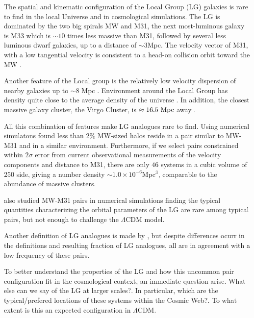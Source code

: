 \documentclass{emulateapj}
\newcommand{\lcdm}{$\Lambda$CDM }
\newcommand{\mpc}{\rm{Mpc}}
\newcommand{\hmpc}{{\ifmmode{h^{-1}{\rm Mpc}}\else{$h^{-1}$Mpc }\fi}}
\begin{document}
The spatial and kinematic configuration of the Local Group
(LG) galaxies is rare to find in the local Universe and in cosmological
simulations. 
The LG is dominated by the two big spirals MW and M31, the next
most-luminous galaxy is M33 which is $\sim 10$ times less massive than
M31, followed by several less luminous dwarf galaxies, up to a
distance of $\sim 3$\mpc.   
The velocity vector of M31, with a low
tangential velocity is consistent to a head-on collision orbit toward
the MW
\citep{2008MNRAS.386..461C,2012ApJ...753....8V,2012ApJ...753....7S}.   

Another feature of the Local group is the relatively low velocity
dispersion of nearby galaxies up to $\sim 8$ Mpc \citep[][and
  references therein]{1975ApJ...196..313S,2011MNRAS.415L..16A}. 
Environment around the Local Group has density quite close to the
average density of the universe
\citep{2003ApJ...596...19K,2005AJ....129..178K}. 
In addition, the
closest massive galaxy cluster, the Virgo Cluster, is $\approx
16.5\ \mpc$ away \citep{2007ApJ...655..144M}.  

All this combination of features make LG analogues rare to
find. 
Using numerical simulatons \citet{lganalogues} found less than
$2\%$ MW-sized halos reside in a pair similar to MW-M31 and in a
similar environment. 
Furthermore, if we select pairs constrained
within $2\sigma$ error from current observational measurements of the
velocity components and distance to M31, there are only $46$ systems
in a cubic volume of $250$ \hmpc side, giving a number density $\sim
1.0\times 10^{-6}$Mpc$^{3}$, comparable to the abundance of massive
clusters.

\citet{2013ApJ...767L...5F} also studied MW-M31 pairs in numerical
simulations finding the typical quantities characterizing the orbital
parameters of the LG are rare among typical pairs, but not enough to
challenge the \lcdm model. 

Another definition of LG analogues is made by
\citet{2008MNRAS.384.1459L}, but despite differences ocurr in the
definitions and resulting fraction of LG analogues, all are in
agreement with a low frequency of these pairs. 

To better understand the properties of the LG and how this uncommon
pair configuration fit in the cosmological context, an immediate
question arise. What else can we say of the LG at larger scales?. In
particular, which are the typical/prefered locations of these systems
within the Cosmic Web?. To what extent is this an expected
configuration in $\Lambda$CDM.
\end{document}
